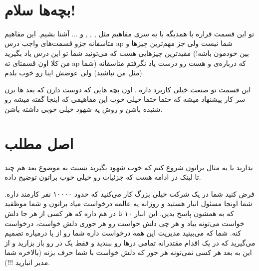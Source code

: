 \documentclass[]{article}
\begin{document}
\newpage
\pagestyle{fancy}
\fancyhf{}
\fancyfoot{}
\cfoot{\thepage}
\renewcommand{\headrulewidth}{2pt}

\KashidaOff


 \Large \textbf{\\
}


\section*{{\titr بچه‌ها سلام!}}
تو این قسمت قراره با همدیگه با یه سری مفاهیم مثل ,  ,  ,  و ... آشنا بشیم. این مفاهیم متاسفانه جزو قسمت‌های واجب درس ap شما نیست ولی جز مهم‌ترین چیز‌ها و مفیدترین چیزهایی هست که می‌تونید شما تو این درس یاد بگیرید (بین خودمون باشه! من کلا اون قسمتای ته ap که درباره‌ی  و  هست رو درست یاد نگرفتم متاسفانه (شما مثل من نباشید) ولی عوضش اینا رو خوب بلدم).
 
این قسمت تو صنعت خیلی کاربرد داره . اون بچه هایی که دوست دارن که بعد ها برن سر کار پیشنهاد میشه که حتما حتما خیلی خوب  این مفاهیمی که اینجا گفته میشه رو شنیده باشن و روش یه شهود خیلی خوبی داشته باشن.

\section*{{\titr اصل مطلب}}
بذارید با یه مثال براتون شروع کنم که خوب شهود بگیرید نسبت به موضوع بعد هم چند تا لینک در ادامه هست که جزئیات رو خیلی خوب براتون توضیح داده.

فرض کنید شما در یک شرکت خیلی بزرگ کار می‌کنید که حدود ۱۰۰۰۰ نفر کارمند داره. شما اونجا مسئول انبار هستید و روزانه یه عالمه درخواست میاد براتون و شما موظفید که به همشون پاسخ بدین. این انبار ۱۰ تا در هم داره که هر کسی از هر جا دلش خواست می‌تونه بیاد و هر چی دلش خواست رو هر جوری دلش خواست، درخواست کنه. شما که می‌بینید مدیریت این همه درخواست داره شما رو از پا درمیاره تصمیم می‌گیرید که در یک اقدام مقتدرانه تمامی درها رو ببندید و فقط یک در رو باز بزارید و از این به بعد هر کسی نمی‌تونه هر جور که دلش خواست با شما حرف بزنه (بالاخره شما مدیر انبارید !!!).
\end{document}

